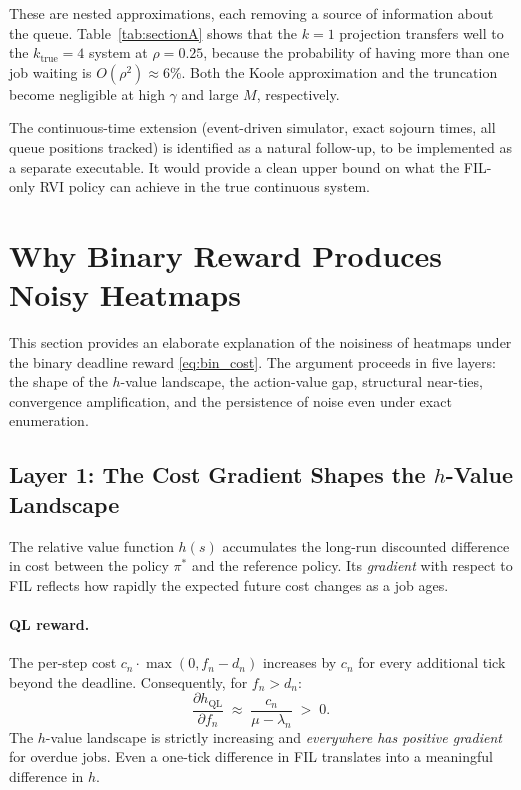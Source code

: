 \documentclass[11pt,a4paper]{article}
\begin{document}
These are nested approximations, each removing a source of information about
the queue.  Table~\ref{tab:sectionA} shows that the $k=1$ projection transfers
well to the $k_\text{true} = 4$ system at $\rho = 0.25$, because the probability
of having more than one job waiting is $O(\rho^2) \approx 6\%$.  Both the Koole
approximation and the truncation become negligible at high $\gamma$ and large
$M$, respectively.

The continuous-time extension (event-driven simulator, exact sojourn times,
all queue positions tracked) is identified as a natural follow-up, to be
implemented as a separate executable.  It would provide a clean upper bound on
what the FIL-only RVI policy can achieve in the true continuous system.


\section{Why Binary Reward Produces Noisy Heatmaps}
\label{sec:binary}

This section provides an elaborate explanation of the noisiness of heatmaps
under the binary deadline reward \eqref{eq:bin_cost}.  The argument proceeds
in five layers: the shape of the $h$-value landscape, the action-value gap,
structural near-ties, convergence amplification, and the persistence of noise
even under exact enumeration.

\subsection{Layer 1: The Cost Gradient Shapes the $h$-Value Landscape}

The relative value function $h(s)$ accumulates the long-run discounted
difference in cost between the policy $\pi^*$ and the reference policy.  Its
\emph{gradient} with respect to FIL reflects how rapidly the expected future
cost changes as a job ages.

\paragraph{QL reward.}
The per-step cost $c_n \cdot \max(0, f_n - d_n)$ increases by $c_n$ for every
additional tick beyond the deadline.  Consequently, for $f_n > d_n$:
\[
  \frac{\partial h_\text{QL}}{\partial f_n}
    \;\approx\; \frac{c_n}{\mu - \lambda_n}
    \;>\; 0.
\]
The $h$-value landscape is strictly increasing and \emph{everywhere has positive
gradient} for overdue jobs.  Even a one-tick difference in FIL translates into
a meaningful difference in $h$.
\end{document}
